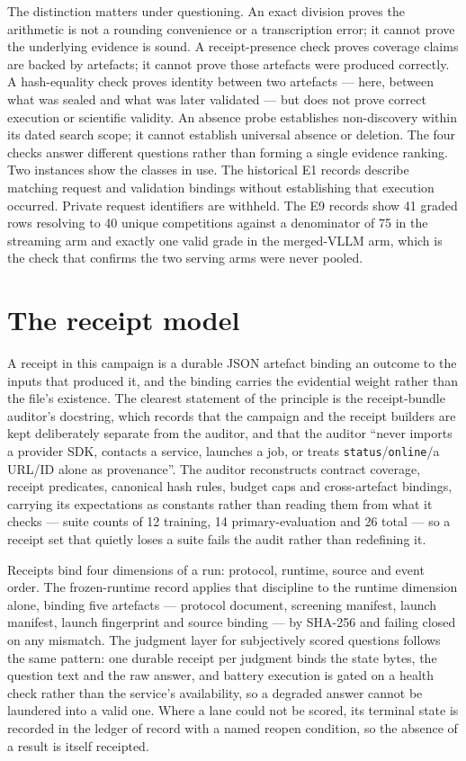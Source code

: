 \documentclass[12pt,a4paper]{report}
\begin{document}
The distinction matters under questioning. An exact division proves the
arithmetic is not a rounding convenience or a transcription error; it
cannot prove the underlying evidence is sound. A receipt-presence check
proves coverage claims are backed by artefacts; it cannot prove those
artefacts were produced correctly. A hash-equality check proves identity
between two artefacts --- here, between what was sealed and what was
later validated --- but does not prove correct execution or scientific
validity. An absence probe establishes non-discovery within its dated
search scope; it cannot establish universal absence or deletion. The
four checks answer different questions rather than forming a single
evidence ranking. Two instances show the classes in use. The historical
E1 records describe matching request and validation bindings without
establishing that execution occurred. Private request identifiers are
withheld. The E9 records show 41 graded rows resolving to 40 unique
competitions against a denominator of 75 in the streaming arm and
exactly one valid grade in the merged-VLLM arm, which is the check that
confirms the two serving arms were never pooled.

\section{The receipt model}\label{the-receipt-model}

A receipt in this campaign is a durable JSON artefact binding an outcome
to the inputs that produced it, and the binding carries the evidential
weight rather than the file's existence. The clearest statement of the
principle is the receipt-bundle auditor's docstring, which records that
the campaign and the receipt builders are kept deliberately separate
from the auditor, and that the auditor ``never imports a provider SDK,
contacts a service, launches a job, or treats
\texttt{status}/\texttt{online}/a URL/ID alone as provenance''. The
auditor reconstructs contract coverage, receipt predicates, canonical
hash rules, budget caps and cross-artefact bindings, carrying its
expectations as constants rather than reading them from what it checks
--- suite counts of 12 training, 14 primary-evaluation and 26 total ---
so a receipt set that quietly loses a suite fails the audit rather than
redefining it.

Receipts bind four dimensions of a run: protocol, runtime, source and
event order. The frozen-runtime record applies that discipline to the
runtime dimension alone, binding five artefacts --- protocol document,
screening manifest, launch manifest, launch fingerprint and source
binding --- by SHA-256 and failing closed on any mismatch. The judgment
layer for subjectively scored questions follows the same pattern: one
durable receipt per judgment binds the state bytes, the question text
and the raw answer, and battery execution is gated on a health check
rather than the service's availability, so a degraded answer cannot be
laundered into a valid one. Where a lane could not be scored, its
terminal state is recorded in the ledger of record with a named reopen
condition, so the absence of a result is itself receipted.
\end{document}
